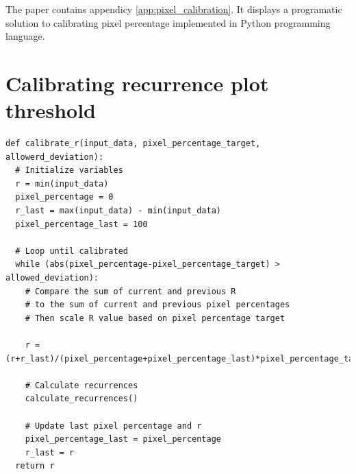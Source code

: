 \documentclass[a4paper,12pt,fleqn]{article}
\begin{document}
\newpage
\begin{appendices}
  The paper contains appendicy \ref{app:pixel_calibration}. It displays a programatic solution to calibrating pixel percentage implemented in Python programming language.
  \newpage
  \section{Calibrating recurrence plot threshold }
  \begin{lstlisting}[caption={Pixel percentage calibration}]
def calibrate_r(input_data, pixel_percentage_target, allowerd_deviation):
  # Initialize variables
  r = min(input_data)
  pixel_percentage = 0
  r_last = max(input_data) - min(input_data)
  pixel_percentage_last = 100

  # Loop until calibrated
  while (abs(pixel_percentage-pixel_percentage_target) > allowed_deviation):
    # Compare the sum of current and previous R
    # to the sum of current and previous pixel percentages
    # Then scale R value based on pixel percentage target

    r = (r+r_last)/(pixel_percentage+pixel_percentage_last)*pixel_percentage_target
    
    # Calculate recurrences
    calculate_recurrences()

    # Update last pixel percentage and r
    pixel_percentage_last = pixel_percentage
    r_last = r
  return r
  \end{lstlisting}
  \label{app:pixel_calibration}

\end{appendices}
\end{document}
